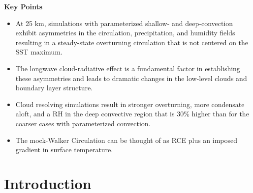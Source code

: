 \documentclass[11pt]{article}   	%
\begin{document}
\textbf{Key Points}
\begin{itemize}
  \item{At 25 km, simulations with parameterized shallow- and deep-convection exhibit asymmetries in the circulation, 
  precipitation, and humidity fields resulting in a steady-state overturning circulation that is not centered on the SST
  maximum.}
  \item{The longwave cloud-radiative effect is a fundamental factor in establishing these asymmetries and leads to dramatic
  changes in the low-level clouds and boundary layer structure.}
  \item{Cloud resolving simulations result in stronger overturning, more condensate aloft, and a RH in the deep convective 
  region that is 30\% higher than for the coarser cases with parameterized convection.}
  \item{The mock-Walker Circulation can be thought of as RCE plus an imposed gradient in surface temperature.}
\end{itemize}

\section{Introduction}
\end{document}
